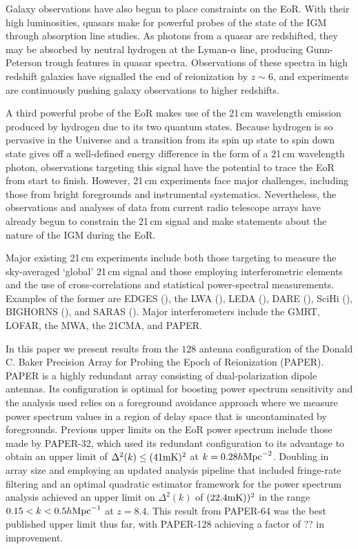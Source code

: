 \documentclass[preprint2,numberedappendix,tighten,twocolappendix]{aastex6}  %
\begin{document}
Galaxy observations have also begun to place constraints on the EoR. With their high luminosities, quasars make for powerful probes of the state of the IGM through absorption line studies. As photons from a quasar are redshifted, they may be absorbed by neutral hydrogen at the Lyman-$\alpha$ line, producing Gunn-Peterson trough features in quasar spectra. Observations of these spectra in high redshift galaxies have signalled the end of reionization by $z \sim 6$, and experiments are continuously pushing galaxy observations to higher redshifts. 

A third powerful probe of the EoR makes use of the 21\,cm wavelength emission produced by hydrogen due to its two quantum states. Because hydrogen is so pervasive in the Universe and a transition from its spin up state to spin down state gives off a  well-defined energy difference in the form of a 21\,cm wavelength photon, observations targeting this signal have the potential to trace the EoR from start to finish. However, 21\,cm experiments face major challenges, including those from bright foregrounds and instrumental systematics. Nevertheless, the observations and analyses of data from current radio telescope arrays have already begun to constrain the 21\,cm signal and make statements about the nature of the IGM during the EoR. 

Major existing 21\,cm experiments include both those targeting to measure the sky-averaged `global' 21\,cm signal and those employing interferometric elements and the use of cross-correlations and statistical power-spectral measurements. Examples of the former are EDGES (\citealt{bowman2010}), the LWA (\citealt{ellingson_et_al2009}), LEDA (\citealt{greenhill_bernardi2012}), DARE (\citealt{burns2012}), SciHi (\citealt{voytek2014}), BIGHORNS (\citealt{sokolowski2015}), and SARAS (\citealt{patra2015}). Major interferometers include the GMRT, LOFAR, the MWA, the 21CMA, and PAPER.

In this paper we present results from the $128$ antenna configuration of the Donald C. Baker Precision Array for Probing the Epoch of Reionization (PAPER). PAPER is a highly redundant array consisting of dual-polarization dipole antennas. Its configuration is optimal for boosting power spectrum sensitivity and the analysis used relies on a foreground avoidance approach where we measure power spectrum values in a region of delay space that is uncontaminated by foregrounds. Previous upper limits on the EoR power spectrum include those made by PAPER-32, which used its redundant configuration to its advantage to obtain an upper limit of $\Delta^{2}(k) \leq (41 {\rm mK})^{2}$ at $k=0.28h {\rm Mpc}^{-2}$. Doubling in array size and employing an updated analysis pipeline that included fringe-rate filtering and an optimal quadratic estimator framework for the power spectrum analysis achieved an upper limit on $\Delta^{2}(k)$ of $(22.4 {\rm mK}))^{2}$ in the range $0.15 < k < 0.5h {\rm Mpc}^{-1}$ at $z = 8.4$. This result from PAPER-64 was the best published upper limit thus far, with PAPER-128 achieving a factor of ?? in improvement.
\end{document}
